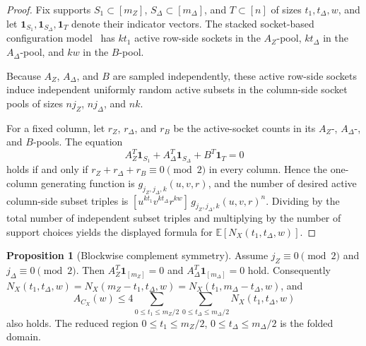 \documentclass[11pt]{article}
\theoremstyle{definition}
\newtheorem{proposition}[theorem]{Proposition}
\newcommand{\EE}{\mathbb E}
\newcommand{\ones}{\mathbf 1}
\newcommand{\CX}{C_X}
\newcommand{\NX}{N_X}
\begin{document}
\begin{proof}
Fix supports \(S_1\subset[m_Z]\), \(S_\Delta\subset[m_\Delta]\), and \(T\subset[n]\) of sizes \(t_1,t_\Delta,w\), and let \(\ones_{S_1}, \ones_{S_\Delta}, \ones_T\) denote their indicator vectors. The stacked socket-based configuration model~\cite[Secs.~3.3--3.4]{RU08} has \(kt_1\) active row-side sockets in the \(A_Z\)-pool, \(kt_\Delta\) in the \(A_\Delta\)-pool, and \(kw\) in the \(B\)-pool.

Because \(A_Z\), \(A_\Delta\), and \(B\) are sampled independently, these active row-side sockets induce independent uniformly random active subsets in the column-side socket pools of sizes \(n j_Z\), \(n j_\Delta\), and \(nk\).

For a fixed column, let \(r_Z\), \(r_\Delta\), and \(r_B\) be the active-socket counts in its \(A_Z\)-, \(A_\Delta\)-, and \(B\)-pools. The equation
\[
A_Z^T\ones_{S_1}+A_\Delta^T\ones_{S_\Delta}+B^T\ones_T=0
\]
holds if and only if \(r_Z+r_\Delta+r_B\equiv 0\pmod 2\) in every column. Hence the one-column generating function is \(g_{j_Z,j_\Delta,k}(u,v,r)\), and the number of desired active column-side subset triples is
\([u^{kt_1}v^{kt_\Delta}r^{kw}]\,g_{j_Z,j_\Delta,k}(u,v,r)^n\).
Dividing by the total number of independent subset triples and multiplying by the number of support choices yields the displayed formula for \(\EE[\NX(t_1,t_\Delta,w)]\).
\end{proof}

\begin{proposition}[Blockwise complement symmetry]\label{prop:fold-jp}
Assume \(j_Z\equiv 0\pmod 2\) and \(j_\Delta\equiv 0\pmod 2\). Then \(A_Z^T\ones_{[m_Z]}=0\) and \(A_\Delta^T\ones_{[m_\Delta]}=0\) hold. Consequently \(\NX(t_1,t_\Delta,w)=\NX(m_Z-t_1,t_\Delta,w)=\NX(t_1,m_\Delta-t_\Delta,w)\), and
\begin{equation}\label{eq:fold-bound-jp}
A_{\CX}(w)
\le
4\sum_{0\le t_1\le m_Z/2}\sum_{0\le t_\Delta\le m_\Delta/2}\NX(t_1,t_\Delta,w)
\end{equation}
also holds. The reduced region \(0\le t_1\le m_Z/2\), \(0\le t_\Delta\le m_\Delta/2\) is the folded domain.
\end{proposition}
\end{document}
